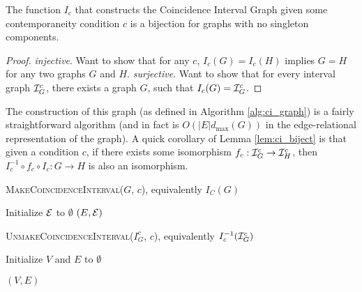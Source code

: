 \begin{lemma}
  \label{lem:ci_biject}
  The function $I_c$ that constructs the Coincidence Interval Graph given some
  contemporaneity condition $c$ is a bijection for graphs with no singleton
  components.
\end{lemma}

\begin{proof}
  \textit{injective}. Want to show that for any $c$, $I_c(G) = I_c(H)$ implies
  $G = H$ for any two graphs $G$ and $H$.  
  \textit{surjective}. Want to show that for every interval graph $\mathcal{I}^c_G$,
  there exists a graph $G$, such that $I_c(G) = \mathcal{I}^c_G$.  
\end{proof}

The construction of this graph (as defined in Algorithm
\ref{alg:ci_graph}) is a fairly straightforward algorithm
(and in fact is $O(|E|d_{\max}(G))$ in the edge-relational representation of the
graph). A quick corollary of Lemma \ref{lem:ci_biject} is that given a condition
$c$, if there exists some isomorphism $f_c : \mathcal{I}^c_G \to \mathcal{I}^c_H$, then $I_c^{-1}
\circ f_c \circ I_c : G \to H$ is also an isomorphism.

\begin{algorithm}
  \label{alg:ci_graph}
  \caption{\textsc{MakeCoincidenceInterval($G$, $c$)}, equivalently $I_C(G)$}
  \SetAlgoLined

  Initialize $\mathcal{E}$ to $\emptyset$\;
  \Return $(E, \mathcal{E})$\;
\end{algorithm}

\begin{algorithm}
  \label{alg:ci_graph_inv}
  \caption{\textsc{UnmakeCoincidenceInterval($I_G^c$, $c$)}, equivalently $I_c^{-1}(\mathcal{I}_G^c)$ }

  Initialize $V$ and $E$ to $\emptyset$\;
  
  \Return $(V,E)$\;
\end{algorithm}

